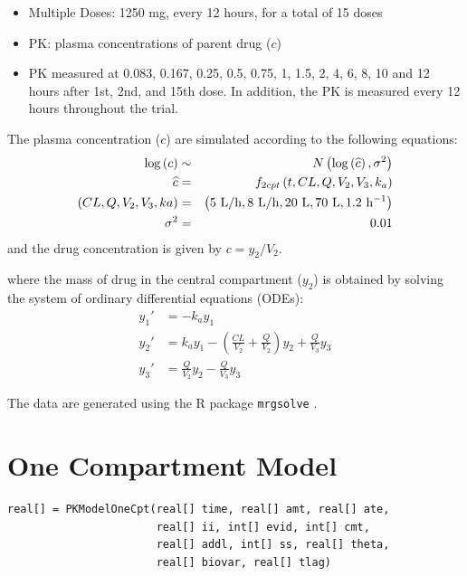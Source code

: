 \documentclass[11pt, reqno]{amsbook}
\numberwithin{section}{chapter}
\theoremstyle{remark}
\begin{document}
\begin{itemize}
\item Multiple Doses: 1250 mg, every 12 hours, for a total of 15 doses
\item PK: plasma concentrations of parent drug (\(c\))
\item PK measured at 0.083, 0.167, 0.25, 0.5, 0.75, 1, 1.5, 2, 4, 6,
8, 10 and 12 hours after 1st, 2nd, and 15th dose. In addition, the
PK is measured every 12 hours throughout the trial.
\end{itemize}

The plasma concentration (\(c\)) are simulated according to the following equations:
\begin{eqnarray*}
  \log\left(c\right) &\sim& N\left(\log\left(\widehat{c}\right),\sigma^2\right) \\
  \widehat{c} &=& f_{2cpt}\left(t, CL, Q, V_2, V_3, k_a\right) \\
  \left(CL, Q, V_2, V_3, ka\right) &=& 
                                       \left(5\ {\rm L/h}, 8\  {\rm L/h}, 20\  {\rm L},  70\ {\rm L}, 1.2\ {\rm h^{-1}} \right) \\
  \sigma^2 &=& 0.01
\end{eqnarray*}
and the drug concentration is given by \(c = y_2/V_2\).

where the mass of drug in the central compartment (\(y_2\)) is obtained
by solving the system of ordinary differential equations (ODEs):
\begin{align*}
  y_1' &= -k_a y_1 \\
  y_2' &= k_a y_1 - \left(\frac{CL}{V_2} + \frac{Q}{V_2}\right) y_2 +  \frac{Q}{V_3}  y_3  \\ 
  y_3' &= \frac{Q}{V_2} y_2 - \frac{Q}{V_3} y_3
\end{align*}

The data are generated using the R package \texttt{mrgsolve} \cite{Baron000}. 


\section{One Compartment Model}
\label{sec:org708bdeb}
\begin{verbatim}
real[] = PKModelOneCpt(real[] time, real[] amt, real[] ate,
                       real[] ii, int[] evid, int[] cmt,
                       real[] addl, int[] ss, real[] theta,
                       real[] biovar, real[] tlag)
\end{verbatim}
\end{document}
